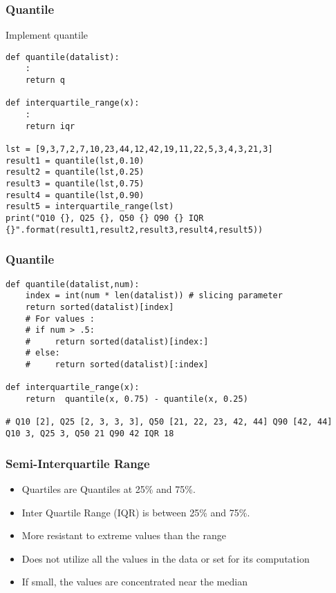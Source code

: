 \begin{frame}[fragile]\frametitle{Quantile}
Implement quantile
\begin{lstlisting}
def quantile(datalist):
	:
	return q

def interquartile_range(x):
	:
	return iqr
	
lst = [9,3,7,2,7,10,23,44,12,42,19,11,22,5,3,4,3,21,3]
result1 = quantile(lst,0.10)
result2 = quantile(lst,0.25)
result3 = quantile(lst,0.75)
result4 = quantile(lst,0.90)
result5 = interquartile_range(lst)
print("Q10 {}, Q25 {}, Q50 {} Q90 {} IQR {}".format(result1,result2,result3,result4,result5))
\end{lstlisting}
\end{frame}


\begin{frame}[fragile]\frametitle{Quantile}
\begin{lstlisting}
def quantile(datalist,num):
    index = int(num * len(datalist)) # slicing parameter
    return sorted(datalist)[index]
    # For values :
    # if num > .5:
    #     return sorted(datalist)[index:]
    # else:
    #     return sorted(datalist)[:index]

def interquartile_range(x):
    return	quantile(x, 0.75) - quantile(x, 0.25)

# Q10 [2], Q25 [2, 3, 3, 3], Q50 [21, 22, 23, 42, 44] Q90 [42, 44]
Q10 3, Q25 3, Q50 21 Q90 42 IQR 18
\end{lstlisting}
\end{frame}

\begin{frame}[fragile]\frametitle{Semi-Interquartile Range}	
\begin{itemize}
\item Quartiles are Quantiles at 25\% and 75\%.
\item Inter Quartile Range (IQR) is between 25\% and 75\%.
\item More resistant to extreme values than the range
\item Does not utilize all the values in the data or set for its computation
\item If small, the values are concentrated near the median
\end{itemize}
\end{frame}

